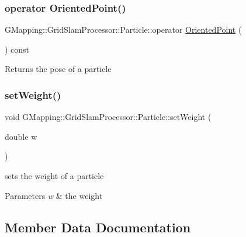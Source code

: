 \subsubsection{\texorpdfstring{operator Oriented\+Point()}{operator OrientedPoint()}}
{\footnotesize\ttfamily G\+Mapping\+::\+Grid\+Slam\+Processor\+::\+Particle\+::operator \hyperlink{structGMapping_1_1orientedpoint}{Oriented\+Point} (\begin{DoxyParamCaption}{ }\end{DoxyParamCaption}) const\hspace{0.3cm}{\ttfamily [inline]}}

\begin{DoxyReturn}{Returns}
the pose of a particle 
\end{DoxyReturn}
\mbox{\label{structGMapping_1_1GridSlamProcessor_1_1Particle_a07888ebc307fab0bfee912bbfda45832}} 
\subsubsection{\texorpdfstring{set\+Weight()}{setWeight()}}
{\footnotesize\ttfamily void G\+Mapping\+::\+Grid\+Slam\+Processor\+::\+Particle\+::set\+Weight (\begin{DoxyParamCaption}\item[{double}]{w }\end{DoxyParamCaption})\hspace{0.3cm}{\ttfamily [inline]}}

sets the weight of a particle 
\begin{DoxyParams}{Parameters}
{\em w} & the weight \\
\hline
\end{DoxyParams}


\subsection{Member Data Documentation}
\mbox{\label{structGMapping_1_1GridSlamProcessor_1_1Particle_a33f1690ccf3a95622e0246e75f5af145}} 
